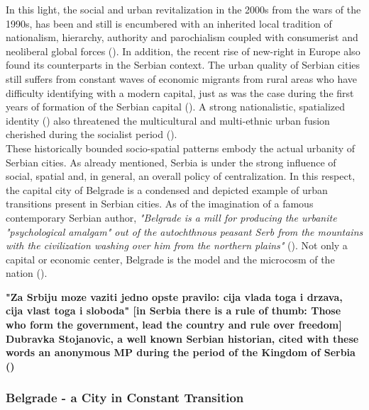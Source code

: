 \documentclass[11pt]{report}
\begin{document}
{{{{%
In this light, the social and urban revitalization in the 2000s from the wars of the 1990s, has been and still is encumbered with an inherited local tradition of nationalism, hierarchy, authority and parochialism coupled with consumerist and neoliberal global forces (\href{Stupar}{\citealt{stupar_recreating_2004}}).
In addition, the recent rise of new-right in Europe also found its counterparts in the Serbian context. The urban quality of Serbian cities still suffers from constant waves of economic migrants from rural areas who have difficulty identifying with a modern capital, just as was the case during the first years of formation of the Serbian capital (\href{ref}{\citealt{doytchinov_planning_2015}}).
A strong nationalistic, spatialized identity (\href{Savic}{\citealt{savic_where_2014}}) also threatened the multicultural and multi-ethnic urban fusion cherished during the socialist period (\href{Stupar}{\citealt{stupar_recreating_2004}}).
\\

These historically bounded socio-spatial patterns embody the actual urbanity of Serbian cities. As already mentioned, Serbia is under the strong influence of social, spatial and, in general, an overall policy of centralization. In this respect, the capital city of Belgrade is a condensed and depicted example of urban transitions present in Serbian cities. As of the imagination of a famous contemporary Serbian author,  \textit{"Belgrade is a mill for producing the urbanite "psychological amalgam" out of the autochthnous peasant Serb from the mountains with the civilization washing over him from the northern plains"} (\href{Velmar}{\citealt{jankovic_pogled_1992}}). Not only a capital or economic center, Belgrade is the model and the microcosm of the nation (\href{Zivkovic}{\citealt{zivkovic_serbian_2011}}).

\textbf{"Za Srbiju moze vaziti jedno opste pravilo: cija vlada toga i drzava, cija vlast toga i sloboda" [in Serbia there is a rule of thumb: Those who form the government, lead the country and rule over freedom] Dubravka Stojanovic, a well known Serbian historian, cited with these words an anonymous MP during the period of the Kingdom of Serbia (\href{Stojanovic}{\citealt{stojanovic_u_2010}})}

\subsubsection{Belgrade - a City in Constant Transition}

}}}}
\end{document}
